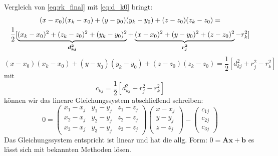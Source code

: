 %
Vergleich von \eqref{eq:rk_final} mit \eqref{eq:d_k0} bringt: 
%
\begin{multline}
(x-x_0)(x_k-x_0)+(y-y_0)(y_k-y_0)+(z-z_0)(z_k-z_0)= \\\frac{1}{2}[\underbrace{(x_k-x_0)^2+(z_k-z_0)^2+(y_k-y_0)^2}_\text{\boldmath{$d_{kj}^2$}}+\underbrace{(x-x_0)^2+(y-y_0)^2 +(z-z_0)^2}_\text{\boldmath{$r_j^2$}}-r_k^2]
\end{multline}
%
\begin{equation}
(x-x_0)(x_k-x_0)+(y-y_0)(y_k-y_0)+(z-z_0)(z_k-z_0)=\frac{1}{2}[d_{kj}^2+r_{j}^2-r_k^2]\label{eq:rk_final_simplyfied}
\end{equation}
mit 
\begin{equation}\label{eq:c_kj}
c_{kj}=\frac{1}{2}[d_{kj}^2+r_{j}^2-r_k^2]
\end{equation}
können wir das lineare Gleichungssystem abschließend schreiben:
%
\begin{equation}
0=
\left(
	\begin{array}{ccc}
		x_1-x_j & y_1-y_j & z_1-z_j \\
		x_2-x_j & y_2-y_j & z_2-z_j \\
		x_3-x_j & y_3-y_j & z_3-z_j
	\end{array}
\right)
\left(
   \begin{array}{c}
	   x-x_j\\
	   y-y_j\\
	   z-z_j
   \end{array}
\right)
-
\left(
	\begin{array}{c}
		c_{1j}\\
		c_{2j}\\
		c_{3j}
	\end{array}
\right)
\end{equation}
%
Das Gleichungssystem entspricht ist linear und hat die allg. Form: $0 = \mathbf{Ax}+\mathbf{b}$ es lässt sich mit bekannten Methoden lösen.



